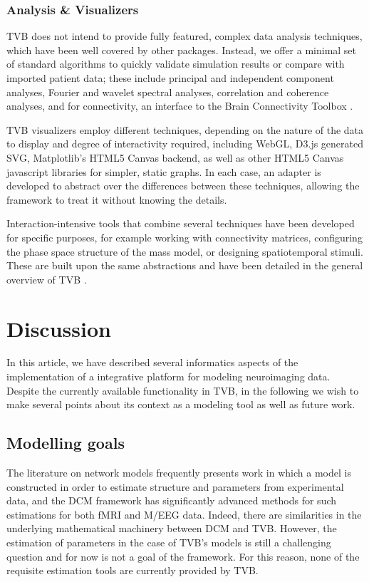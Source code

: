 \documentclass{bioinfo}
\begin{document}
\subsubsection{Analysis \& Visualizers}

TVB does not intend to provide fully featured, complex data analysis
techniques, which have been well covered by other packages. 
Instead, we offer a minimal set of standard algorithms to quickly
validate simulation results or compare with imported patient data; 
these include principal and independent component analyses, 
Fourier and wavelet spectral analyses, correlation and coherence
analyses, and for connectivity, an interface to the Brain 
Connectivity Toolbox \citep{Rubinov_2010}. 

TVB visualizers employ different techniques, depending on the nature of
the data to display and degree of interactivity required, including WebGL,
D3.js generated SVG, Matplotlib's HTML5 Canvas backend, as well as other
HTML5 Canvas javascript libraries for simpler, static graphs. In each case,
an adapter is developed to abstract over the differences between these
techniques, allowing the framework to treat it without knowing the details.

Interaction-intensive tools that combine several techniques have been developed
for specific purposes, for example working with connectivity matrices, 
configuring the phase space structure of the mass model, or designing
spatiotemporal stimuli. These are built upon the same abstractions and have been
detailed in the general overview of TVB \citep{Sanz-Lean_2013}.

\section{Discussion}

In this article, we have described several informatics aspects of the
implementation of a integrative platform for modeling neuroimaging data.
Despite the currently available functionality in TVB, in the following we wish
to make several points about its context as a modeling tool as well as 
future work. 

\subsection{Modelling goals}

The literature on network models frequently presents work in which a model
is constructed in order to estimate structure and parameters from 
experimental data, and the DCM framework has significantly advanced 
methods for such estimations for both fMRI and M/EEG data. Indeed, there
are similarities in the underlying mathematical machinery between DCM and 
TVB. However, the estimation of parameters in the case of TVB's models
is still a challenging question and for now is not a goal of the framework. 
For this reason, none of the requisite estimation tools are currently 
provided by TVB.
\end{document}
